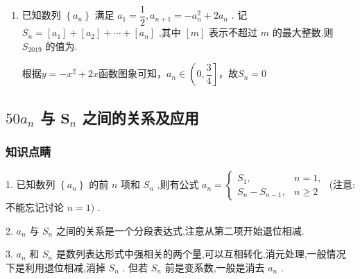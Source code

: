 \begin{enumerate}
\begin{jieda}
        故有$a_{n+1} = 2a_n + 2^n$，两侧同时除以$2^{n+1}$可得$\dfrac{a_{n+1}}{2^{n+1}} = \dfrac{a_n}{2^n} + \dfrac{1}{2}$，$\dfrac{a_1}{2} = \dfrac{1}{2}$，故$\left\{\dfrac{a_n}{2^n}\right\}$是以$\dfrac{1}{2}$为首项，$\dfrac{1}{2}$为公差的等差数列，因此$\dfrac{a_n}{2^n} = \dfrac{n}{2}$，故$a_n = n2^{n-1}$
    \end{jieda}
    \item 已知数列 $\left\{  {a}_{n}\right\}$ 满足 ${a}_{1} = \dfrac{1}{2},{a}_{n + 1} =  - {a}_{n}^{2} + 2{a}_{n}$ . 记 ${S}_{n} = \left\lbrack  {a}_{1}\right\rbrack   + \left\lbrack  {a}_{2}\right\rbrack   + \cdots  + \left\lbrack  {a}_{n}\right\rbrack$ ,其中 $\left\lbrack  m\right\rbrack$ 表示不超过 $m$ 的最大整数,则 ${S}_{2019}$ 的值为.
    \begin{jieda}
        根据$y = -x^2+2x$函数图象可知，$a_n \in \left(0, \dfrac{3}{4}\right]$，故$S_n = 0$
    \end{jieda}

\end{enumerate}
\subsection*{${50} {a}_{n}$ 与 ${\mathbf{S}}_{n}$ 之间的关系及应用}

\subsubsection*{知识点睛}

1. 已知数列 $\left\{  {a}_{n}\right\}$ 的前 $n$ 项和 ${S}_{n}$ ,则有公式 ${a}_{n} = \left\{  \begin{array}{ll} {S}_{1}, & n = 1, \\  {S}_{n} - {S}_{n - 1}, & n \geq  2 \end{array}\right.$ (注意: 不能忘记讨论 $n = 1)$ .

2. ${a}_{n}$ 与 ${S}_{n}$ 之间的关系是一个分段表达式,注意从第二项开始退位相减.

3. ${a}_{n}$ 和 ${S}_{n}$ 是数列表达形式中强相关的两个量,可以互相转化,消元处理,一般情况下是利用退位相减,消掉 ${S}_{n}$ . 但若 ${S}_{n}$ 前是变系数,一般是消去 ${a}_{n}$ .

